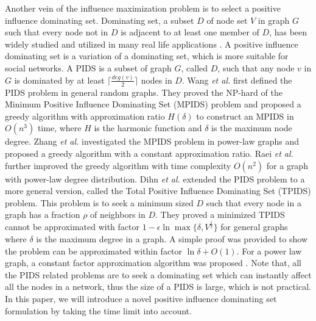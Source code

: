Another vein of the influence maximization problem is to select a positive influence dominating set.
Dominating set, a subset $D$ of node set $V$ in graph $G$ such that every node not in $D$ is adjacent to at least one member of $D$,
has been widely studied and utilized in many real life applications \cite{GWL2009}.
A positive influence dominating set is a variation of a dominating set, which is more suitable for social networks.
A PIDS is a subset of graph $G$, called $D$, such that any node $v$ in $G$ is dominated by at least $\lceil\frac{deg(v)}{2}\rceil$ nodes in $D$.
Wang {\it et al.} \cite{WDC2011} first defined the PIDS problem in general random graphs.
They proved the NP-hard of the Minimum Positive Influence Dominating Set (MPIDS) problem and proposed a greedy algorithm with approximation ratio $H(\delta)$ to construct an MPIDS
in $O(n^3)$ time, where $H$ is the harmonic function and $\delta$ is the maximum node degree.
Zhang {\it et al.} \cite{ZWW2011} investigated the MPIDS problem in power-law graphs and proposed a greedy algorithm with a constant approximation ratio.
Raei {\it et al.} \cite{CLZ2012} further improved the greedy algorithm with time complexity $O(n^2)$ for a graph with power-law degree distribution.
Dihn {\it et al.} \cite{DSN2014} extended the PIDS problem to a more general version, called the Total Positive Influence Dominating Set (TPIDS) problem.
This problem is to seek a minimum sized $D$ such that every node in a graph has a fraction $\rho$ of neighbors in $D$.
They proved a minimized TPIDS cannot be approximated with factor $1-\epsilon \ln\max \{\delta, V^\frac{1}{2}\}$ for general graphs where $\delta$ is the maximum degree in a graph.
A simple proof was provided to show the problem can be approximated within factor $\ln \delta + O(1)$.
For a power law graph, a constant factor approximation algorithm was proposed \cite{DSN2014}.
Note that, all the PIDS related problems are to seek a dominating set which can instantly affect all the nodes in a network, thus the size of a PIDS is large, which is not practical.
In this paper, we will introduce a novel positive influence dominating set formulation by taking the time limit into account.

